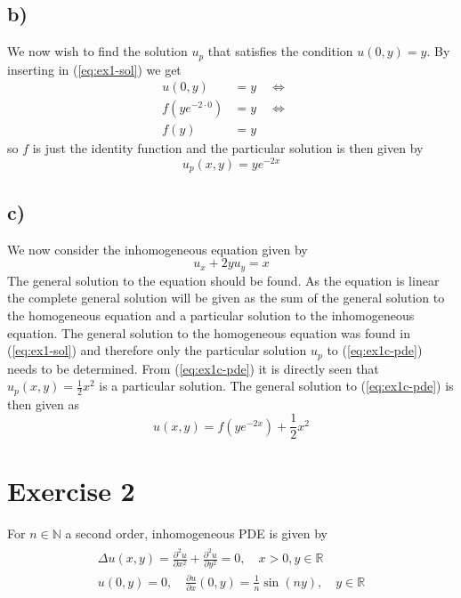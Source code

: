 \documentclass[11pt]{article}
\newcommand\myimp{\quad\Leftrightarrow\quad}
\newcommand\half{\frac{1}{2}}
\newcommand\myreal{\mathbb{R}}
\newcommand\mynatural{\mathbb{N}}
\begin{document}
\subsection*{b)}
We now wish to find the solution $u_p$ that satisfies the condition $u(0,y)=y$. By inserting in (\ref{eq:ex1-sol}) we get
\begin{align*}
    u(0, y) &= y \myimp \\
    f(ye^{-2\cdot 0}) &= y \myimp \\
    f(y) &= y
\end{align*}
so $f$ is just the identity function and the particular solution is then given by
\begin{equation}
    u_p(x, y) = ye^{-2x}
\end{equation}

\subsection*{c)}
We now consider the inhomogeneous equation given by
\begin{equation}\label{eq:ex1c-pde}
    u_x + 2yu_y = x
\end{equation}
The general solution to the equation should be found. As the equation is linear the complete general solution will be given as the sum of the general solution to the homogeneous equation and a particular solution to the inhomogeneous equation. The general solution to the homogeneous equation was found in (\ref{eq:ex1-sol}) and therefore only the particular solution $u_p$ to (\ref{eq:ex1c-pde}) needs to be determined. From (\ref{eq:ex1c-pde}) it is directly seen that $u_p(x, y)=\frac{1}{2}x^2$ is a particular solution. The general solution to (\ref{eq:ex1c-pde}) is then given as
\begin{equation}
    u(x, y) = f(ye^{-2x}) + \half x^2
\end{equation}


\section*{Exercise 2}
For $n\in\mynatural$ a second order, inhomogeneous PDE is given by
\begin{gather}\label{eq:hadamard}
    \begin{split}
    \Delta u(x, y) = \frac{\partial^2u}{\partial x^2} + \frac{\partial^2 u}{\partial y^2} = 0, \quad x>0, y\in\myreal \\
    u(0,y) = 0, \quad \frac{\partial u}{\partial x}(0, y) = \frac{1}{n}\sin(ny), \quad y\in\myreal
    \end{split}
\end{gather}
\end{document}
